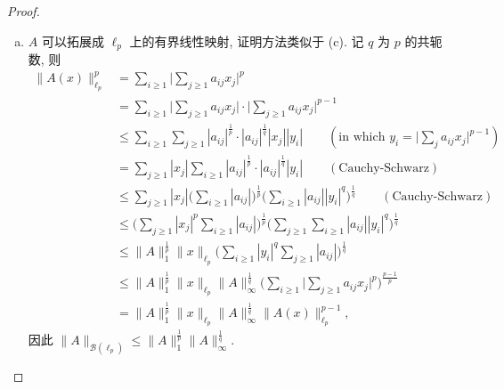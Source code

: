 \begin{proof}
\begin{enumerate}[(a)]
    \item %
      $A$ 可以拓展成 $\ell_p$ 上的有界线性映射, 证明方法类似于 (c).
      记 $q$ 为 $p$ 的共轭数, 则
      \begin{align*}
        \|A(x)\|_{\ell_p}^p
        & = \sum_{i\geq 1} \biggl|\sum_{j\geq 1} a_{ij} x_j\biggr|^p \\
        & = \sum_{i\geq 1} \biggl|\sum_{j\geq 1} a_{ij} x_j\biggr|\cdot
            \biggl|\sum_{j\geq 1} a_{ij} x_j\biggr|^{p-1} \\
        & \leq \sum_{i\geq 1} \sum_{j\geq 1} |a_{ij}|^{\frac{1}{p}} \cdot |a_{ij}|^{\frac{1}{q}}
            |x_j| |y_i| \qquad (\text{in which } y_i = \biggl|\sum_{j} a_{ij}x_j\biggr|^{p-1}) \\
        & = \sum_{j\geq 1} |x_j| \sum_{i\geq 1} |a_{ij}|^{\frac{1}{p}} \cdot
            |a_{ij}|^{\frac{1}{q}} |y_i| \qquad (\text{Cauchy-Schwarz}) \\
        & \leq \sum_{j\geq 1} |x_j| \biggl(\sum_{i\geq 1} |a_{ij}|\biggr)^{\frac{1}{p}}
            \biggl(\sum_{i\geq 1} |a_{ij}| |y_i|^q\biggr)^{\frac{1}{q}} \qquad (\text{Cauchy-Schwarz}) \\
        & \leq \biggl(\sum_{j\geq 1} |x_j|^p \sum_{i\geq 1} |a_{ij}|\biggr)^{\frac{1}{p}}
            \biggl(\sum_{j\geq 1} \sum_{i\geq 1} |a_{ij}| |y_i|^q\biggr)^{\frac{1}{q}} \\
        & \leq \|A\|_1^{\frac{1}{p}} \|x\|_{\ell_p}
            \biggl(\sum_{i\geq 1} |y_i|^q \sum_{j\geq 1} |a_{ij}|\biggr)^{\frac{1}{q}} \\
        & \leq \|A\|_1^{\frac{1}{p}} \|x\|_{\ell_p} \|A\|_\infty^{\frac{1}{q}}
            \biggl(\sum_{i\geq 1} \biggl|\sum_{j\geq 1} a_{ij} x_j\biggr|^p\biggr)^{\frac{p-1}{p}} \\
        & = \|A\|_1^{\frac{1}{p}} \|x\|_{\ell_p} \|A\|_\infty^{\frac{1}{q}}
            \|A(x)\|_{\ell_p}^{p-1},
      \end{align*}
    因此 $\|A\|_{\mathcal{B}(\ell_p)} \leq \|A\|_1^{\frac{1}{p}} \|A\|_\infty^{\frac{1}{q}}$. \qedhere
  \end{enumerate}
\end{proof}
